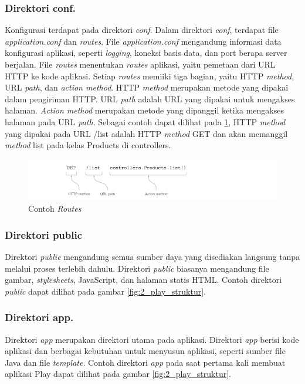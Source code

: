 \subsubsection{Direktori conf.}
Konfigurasi \play terdapat pada direktori \textit{conf}. Dalam direktori \textit{conf}, terdapat file \textit{application.conf} dan \textit{routes}. File \textit{application.conf} mengandung informasi data konfigurasi aplikasi, seperti \textit{logging}, koneksi basis data, dan port berapa server berjalan. File \textit{routes} menentukan \textit{routes} aplikasi, yaitu pemetaan dari URL HTTP ke kode aplikasi. Setiap \textit{routes} memiiki tiga bagian, yaitu HTTP \textit{method}, URL \textit{path}, dan \textit{action method}. HTTP \textit{method} merupakan metode yang dipakai dalam pengiriman HTTP. URL \textit{path} adalah URL yang dipakai untuk mengakses halaman. \textit{Action method} merupakan metode  yang dipanggil ketika mengakses halaman pada URL \textit{path}. Sebagai contoh dapat dilihat pada \ref{fig:2_play_routes}, HTTP \textit{method} yang dipakai pada URL /list adalah HTTP \textit{method} GET dan akan memanggil \textit{method} list pada kelas Products di controllers.

\begin{figure}[H]
	\centering
	\includegraphics[scale=0.7]{Gambar/play-routes}
	\caption{Contoh \textit{Routes}} 
	\label{fig:2_play_routes}
\end{figure}

\subsubsection{Direktori public}
Direktori \textit{public} mengandung semua sumber daya yang disediakan langsung tanpa melalui proses terlebih dahulu. Direktori \textit{public} biasanya mengandung file gambar, \textit{stylesheets}, JavaScript, dan halaman statis HTML. Contoh direktori \textit{public} dapat dilihat pada gambar \ref{fig:2_play_struktur}.
%

\subsubsection{Direktori app.}
Direktori \textit{app} merupakan direktori utama pada aplikasi. Direktori \textit{app} berisi kode aplikasi dan berbagai kebutuhan untuk menyusun aplikasi, seperti sumber file Java dan file \textit{template}. Contoh direktori \textit{app} pada saat pertama kali membuat aplikasi Play dapat dilihat pada gambar \ref{fig:2_play_struktur}. 

